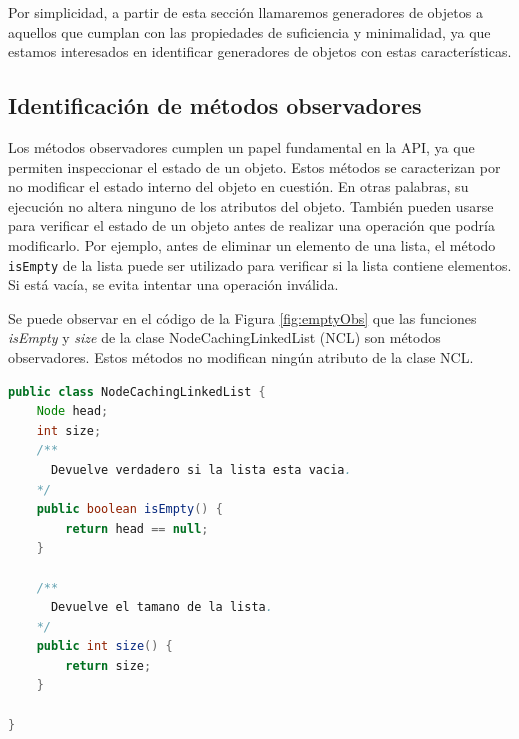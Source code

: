 
Por simplicidad, a partir de esta sección llamaremos generadores de objetos a aquellos que cumplan con las propiedades de suficiencia y minimalidad, ya que estamos interesados en identificar generadores de objetos con estas características.


\subsection{Identificación de métodos observadores}

 Los métodos observadores cumplen un papel fundamental en la API, ya que permiten inspeccionar el estado de un objeto. Estos métodos se caracterizan por no modificar el estado interno del objeto en cuestión. En otras palabras, su ejecución no altera ninguno de los atributos del objeto.
  También pueden usarse para verificar el estado de un objeto antes de realizar una operación que podría modificarlo.
 Por ejemplo, antes de eliminar un elemento de una lista, el método \texttt{isEmpty} de la lista puede ser utilizado para verificar si la lista contiene elementos. Si está vacía, se evita intentar una operación inválida.

Se puede observar en el código de la Figura \ref{fig:emptyObs} que las funciones \emph{isEmpty} y \emph{size} de la clase NodeCachingLinkedList (NCL) son métodos observadores.  Estos métodos no modifican ningún atributo de la clase NCL.
 
\begin{lstlisting}[language=Java, label=fig:emptyObs, caption=Algunos métodos observadores de la clase NCL. Se observa que no modifican el estado de NCL., captionpos=b, frame=tb, float=t]
public class NodeCachingLinkedList {
    Node head;
    int size;
    /**
      Devuelve verdadero si la lista esta vacia. 
    */ 
    public boolean isEmpty() { 
        return head == null; 
    }
    
    /**
      Devuelve el tamano de la lista. 
    */ 
    public int size() { 
        return size; 
    }
    
}
\end{lstlisting}



